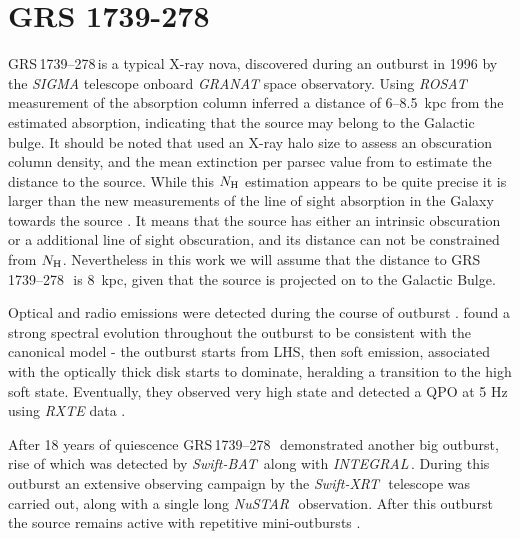 \documentclass[a4paper,fleqn,usenatbib]{mnras}
\def\grs{{GRS\,1739--278\,}}
\def\swiftx{{\em Swift-XRT\,}}
\def\swiftb{{\em Swift-BAT\,}}
\def\nustar{{\em NuSTAR\,}}
\def\integral{{\em INTEGRAL\,}}
\begin{document}
\section{GRS 1739-278}

\grs is a typical X-ray nova, discovered during an outburst in 1996  \citep{paul96} by the {\it SIGMA} \citep{paul91} telescope onboard {\it GRANAT} space observatory.
Using {\it ROSAT} measurement of the absorption column \citet{greiner96} inferred a distance of 6--8.5~kpc from the estimated absorption, indicating that the source may belong to the Galactic bulge. 
It should be noted that \citet{greiner96} used an X-ray halo size to assess an obscuration column density, and the mean extinction per parsec value from \citet{1973asqu.book.....A} to estimate the distance to the source. 
While this $N_{\rm H}$ estimation appears to be quite precise it is larger than the new measurements of the line of sight absorption in the Galaxy towards the source \citep{1990ARA&A..28..215D, 2005A&A...440..775K, 2006A&A...453..635M, 2014A&A...566A.120S}. 
It means that the source has either an intrinsic obscuration or a additional line of sight obscuration,  and its distance can not be constrained from $N_{\rm H}$.
Nevertheless in this work we will assume that the distance to \grs\ is 8~kpc, given that the source is projected on to the Galactic Bulge.  

Optical and radio emissions were detected during the course of outburst \citep{hjellming96,marti97}. 
\citet{borozdin98} found a strong spectral evolution throughout the outburst to be consistent with the canonical model - the outburst starts from LHS, then soft emission, associated with the optically thick disk starts to dominate, heralding a transition to the high soft state. 
Eventually, they observed very high state and detected a QPO at 5 Hz using {\it RXTE} data \citep{borozdin00, 2001MNRAS.328..451W}.

After 18 years of quiescence \grs\ demonstrated another big outburst, rise of which was detected by \swiftb \citep{krimm14_atel} along with \integral \citep{filippova14}. 
During this outburst an extensive observing campaign by the \swiftx\, telescope was carried out, along with a single long \nustar\ observation. 
After this outburst the source remains active with repetitive mini-outbursts \citep{mereminskiy17grs,yan17}.
\end{document}

